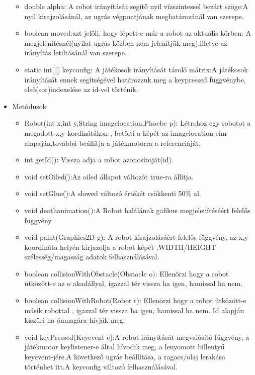 \begin{itemize}
\begin{itemize}
		\item double alpha: A robot irányítását segítő nyil vízszintessel bezárt szöge:A nyil kirajzolásánál, az ugrás végpontjának meghatározánál van szerepe.
		\item boolean moved:azt jelöli, hogy lépett-e már a robot az aktuális körben: A megjelenítésnél(nyilat ugrás közben nem jelenítjük meg),illetve az irányítás letiltásánál van szerepe.
		\item static int[][] keyconfig: A játékosok írányítását tároló mátrix:A játékosok irányítását ennek segítségével határozzuk meg a keypressed függvénybe, első(sor)indexelése az id-vel történik.
\end{itemize}
\item Metódusok\\
	\begin{itemize}
		\item Robot(int x,int y,String imagelocation,Phoebe p): Létrehoz egy robotot a megadott x,y kordinátákon , betölti a képét az imagelocation cím alapaján,továbbá beállítja a játékmotorra a referenciáját.
		\item int getId(): Vissza adja a robot azonosítoját(id).
		\item void setOiled():Az oiled állapot változót true-ra állítja.
		\item void setGlue():A slowed változó értékét csökkenti 50\% al.
		\item void deathanimation():A Robot halálának gafikus megjelenítéséért felelős függvény.
		\item void paint(Graphics2D g): A robot kirajzolásáért felelős függvény, az x,y koordináta helyén kirjazolja a robot képét ,WIDTH/HEIGHT szélesség/magasság adatok felhasználásával.
		\item boolean collisionWithObstacle(Obstacle o): Ellenörzi hogy a robot ütközött-e az o akadállyal, igazzal tér vissza ha igen, hamissal ha nem.
		\item boolean collisionWithRobot(Robot r): Ellenörzi hogy a robot ütközött-e másik robottal , igazzal tér vissza ha igen, hamissal ha nem. Id alapján kiszüri ha önmagára hívják meg.
		\item void keyPressed(Keyevent e):A robot irányítását megvalósító függvény, a játékmotor keylistener-e által hívodik meg, a lenyomott billentyű keyevent-jére.A következő ugrás beállítása, a ragacs/olaj lerakása történhet itt.A keyconfig változó felhasználásával.
	\end{itemize}
\end{itemize}

